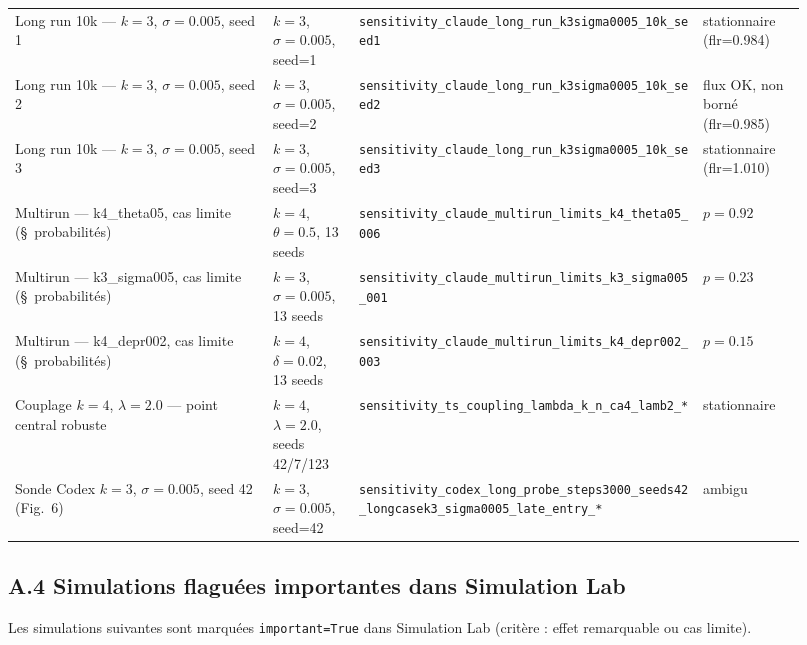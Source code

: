 \begin{longtable}{p{0.30\linewidth}p{0.10\linewidth}p{0.40\linewidth}p{0.12\linewidth}}
Long run 10k — $k=3$, $\sigma=0.005$, seed 1
 & $k=3$, $\sigma=0.005$, seed=1
 & \texttt{sensitivity\_claude\_long\_run\_k3sigma0005\_10k\_seed1}
 & stationnaire (flr=0.984) \\

Long run 10k — $k=3$, $\sigma=0.005$, seed 2
 & $k=3$, $\sigma=0.005$, seed=2
 & \texttt{sensitivity\_claude\_long\_run\_k3sigma0005\_10k\_seed2}
 & flux OK, non borné (flr=0.985) \\

Long run 10k — $k=3$, $\sigma=0.005$, seed 3
 & $k=3$, $\sigma=0.005$, seed=3
 & \texttt{sensitivity\_claude\_long\_run\_k3sigma0005\_10k\_seed3}
 & stationnaire (flr=1.010) \\

Multirun — k4\_theta05, cas limite (§~probabilités)
 & $k=4$, $\theta=0.5$, 13 seeds
 & \texttt{sensitivity\_claude\_multirun\_limits\_k4\_theta05\_006}
 & $p=0.92$ \\

Multirun — k3\_sigma005, cas limite (§~probabilités)
 & $k=3$, $\sigma=0.005$, 13 seeds
 & \texttt{sensitivity\_claude\_multirun\_limits\_k3\_sigma005\_001}
 & $p=0.23$ \\

Multirun — k4\_depr002, cas limite (§~probabilités)
 & $k=4$, $\delta=0.02$, 13 seeds
 & \texttt{sensitivity\_claude\_multirun\_limits\_k4\_depr002\_003}
 & $p=0.15$ \\

Couplage $k=4$, $\lambda=2.0$ — point central robuste
 & $k=4$, $\lambda=2.0$, seeds 42/7/123
 & \texttt{sensitivity\_ts\_coupling\_lambda\_k\_n\_ca4\_lamb2\_*}
 & stationnaire \\

Sonde Codex $k=3$, $\sigma=0.005$, seed 42 (Fig.~6)
 & $k=3$, $\sigma=0.005$, seed=42
 & \texttt{sensitivity\_codex\_long\_probe\_steps3000\_seeds42\_long\-casek3\_sigma0005\_late\_entry\_*}
 & ambigu \\

\hline
\end{longtable}

\subsection*{A.4 Simulations flaguées importantes dans Simulation Lab}

Les simulations suivantes sont marquées \texttt{important=True} dans Simulation Lab
(critère : effet remarquable ou cas limite).

